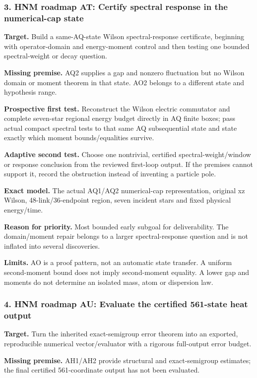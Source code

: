 \subsubsection{3. HNM roadmap AT: Certify spectral response in the numerical-cap state}
\textbf{Target.} Build a same-AQ-state Wilson spectral-response certificate, beginning with operator-domain and energy-moment control and then testing one bounded spectral-weight or decay question.

\textbf{Missing premise.} AQ2 supplies a gap and nonzero fluctuation but no Wilson domain or moment theorem in that state. AO2 belongs to a different state and hypothesis range.

\textbf{Prospective first test.} Reconstruct the Wilson electric commutator and complete seven-star regional energy budget directly in AQ finite boxes; pass actual compact spectral tests to that same AQ subsequential state and state exactly which moment bounds/equalities survive.

\textbf{Adaptive second test.} Choose one nontrivial, certified spectral-weight/window or response conclusion from the reviewed first-loop output. If the premises cannot support it, record the obstruction instead of inventing a particle pole.

\textbf{Exact model.} The actual AQ1/AQ2 numerical-cap representation, original xz Wilson, 48-link/36-endpoint region, seven incident stars and fixed physical energy/time.

\textbf{Reason for priority.} Most bounded early subgoal for deliverability. The domain/moment repair belongs to a larger spectral-response question and is not inflated into several discoveries.

\textbf{Limits.} AO is a proof pattern, not an automatic state transfer. A uniform second-moment bound does not imply second-moment equality. A lower gap and moments do not determine an isolated mass, atom or dispersion law.

\subsubsection{4. HNM roadmap AU: Evaluate the certified 561-state heat output}
\textbf{Target.} Turn the inherited exact-semigroup error theorem into an exported, reproducible numerical vector/evaluator with a rigorous full-output error budget.

\textbf{Missing premise.} AH1/AH2 provide structural and exact-semigroup estimates; the final certified 561-coordinate output has not been evaluated.

